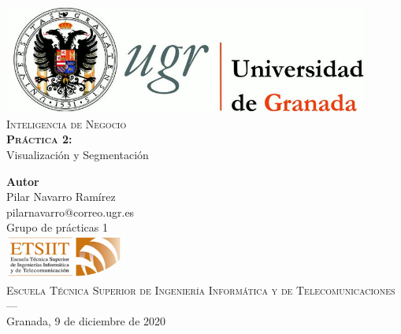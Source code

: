 \begin{titlepage}
 
 
\newlength{\centeroffset}
\setlength{\centeroffset}{-0.5\oddsidemargin}
\addtolength{\centeroffset}{0.5\evensidemargin}
\thispagestyle{empty}

\noindent\hspace*{\centeroffset}\begin{minipage}{\textwidth}

\centering
\includegraphics[width=0.9\textwidth]{img/logo_ugr.jpg}\\[2cm]

\textsc{ \Huge Inteligencia de Negocio\\[1.5cm]}
\textbf{\textsc{ \huge Práctica 2:}}\\
 \huge  Visualización y Segmentación\\[1cm]
% 
\end{minipage}

\vspace{2cm}
\noindent\hspace*{\centeroffset}\begin{minipage}{\textwidth}
\centering

\textbf{Autor}\\[0.2cm] {Pilar Navarro Ramírez}\\[0.2cm]
pilarnavarro@correo.ugr.es \\[0.2cm]
Grupo de prácticas 1 \\[1cm]

\includegraphics[width=0.3\textwidth]{img/etsiit_logo.png}\\[0.1cm]
\textsc{Escuela Técnica Superior de Ingeniería Informática y de Telecomunicaciones}\\
\textsc{---}\\
Granada, 9 de diciembre de 2020
\end{minipage}
\end{titlepage}


